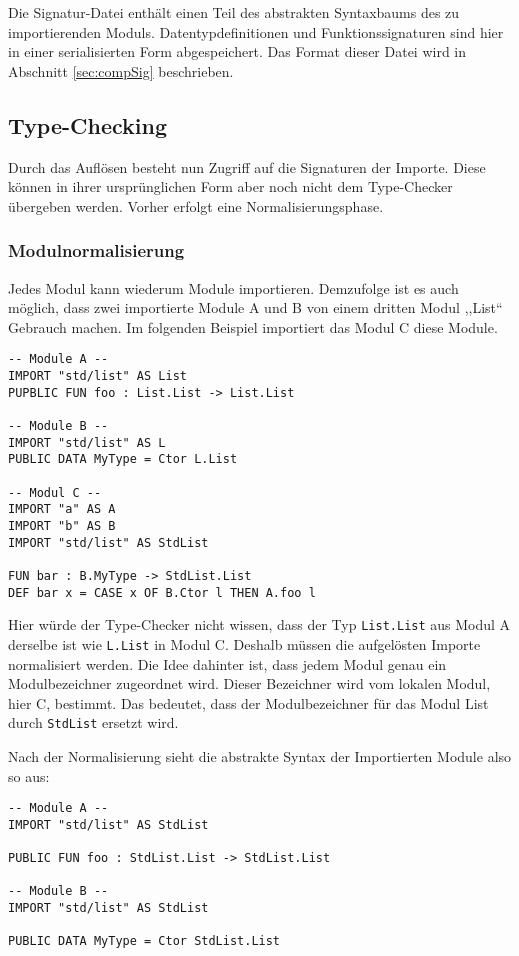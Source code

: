\documentclass[runningheads]{llncs}
\begin{document}
Die Signatur-Datei enthält einen Teil des abstrakten Syntaxbaums des zu importierenden Moduls. Datentypdefinitionen und Funktionssignaturen sind hier in einer serialisierten Form abgespeichert. Das Format dieser Datei wird in Abschnitt \ref{sec:compSig} beschrieben.

\subsection{Type-Checking}
\label{sec:typeChecking}

Durch das Auflösen besteht nun Zugriff auf die Signaturen der Importe. Diese können in ihrer ursprünglichen Form aber noch nicht dem Type-Checker übergeben werden. Vorher erfolgt eine Normalisierungsphase.

\subsubsection{Modulnormalisierung}

Jedes Modul kann wiederum Module importieren. Demzufolge ist es auch möglich, dass zwei importierte Module A und B von einem dritten Modul ,,List`` Gebrauch machen. Im folgenden Beispiel importiert das Modul C diese Module.


\begin{verbatim}
-- Module A --
IMPORT "std/list" AS List
PUPBLIC FUN foo : List.List -> List.List

-- Module B --
IMPORT "std/list" AS L
PUBLIC DATA MyType = Ctor L.List

-- Modul C --
IMPORT "a" AS A
IMPORT "b" AS B
IMPORT "std/list" AS StdList

FUN bar : B.MyType -> StdList.List
DEF bar x = CASE x OF B.Ctor l THEN A.foo l
\end{verbatim}

Hier würde der Type-Checker nicht wissen, dass der Typ \verb|List.List| aus Modul A derselbe ist wie \verb|L.List| in Modul C. Deshalb müssen die aufgelösten Importe normalisiert werden. Die Idee dahinter ist, dass jedem Modul genau ein Modulbezeichner zugeordnet wird. Dieser Bezeichner wird vom lokalen Modul, hier C, bestimmt. Das bedeutet, dass der Modulbezeichner für das Modul List durch \verb|StdList| ersetzt wird.

Nach der Normalisierung sieht die abstrakte Syntax der Importierten Module also so aus:

\begin{verbatim}
-- Module A --
IMPORT "std/list" AS StdList

PUBLIC FUN foo : StdList.List -> StdList.List

-- Module B --
IMPORT "std/list" AS StdList

PUBLIC DATA MyType = Ctor StdList.List
\end{verbatim}
\end{document}
